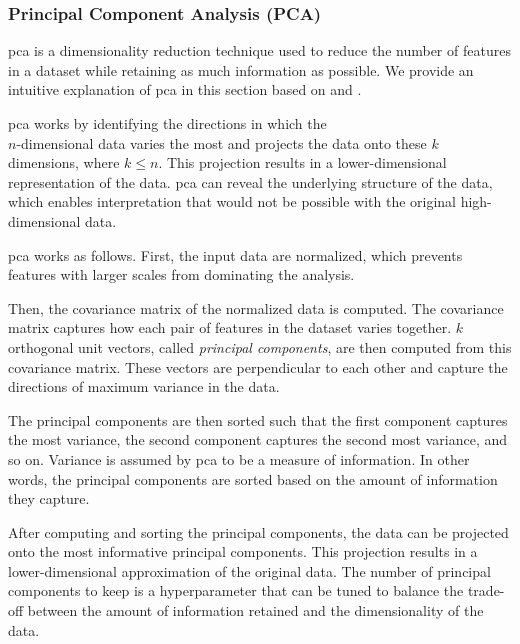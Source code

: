 \subsubsection{Principal Component Analysis (PCA)}\label{subsec:pca}
\gls{pca} is a dimensionality reduction technique used to reduce the number of features in a dataset while retaining as much information as possible.
We provide an intuitive explanation of \gls{pca} in this section based on \citet{dataminingConcepts} and \citet{Vasques2024}.

\gls{pca} works by identifying the directions in which the\\$n$-dimensional data varies the most and projects the data onto these $k$ dimensions, where $k \leq n$.
This projection results in a lower-dimensional representation of the data.
\gls{pca} can reveal the underlying structure of the data, which enables interpretation that would not be possible with the original high-dimensional data.

\gls{pca} works as follows.
First, the input data are normalized, which prevents features with larger scales from dominating the analysis.

Then, the covariance matrix of the normalized data is computed.
The covariance matrix captures how each pair of features in the dataset varies together.
$k$ orthogonal unit vectors, called \textit{principal components}, are then computed from this covariance matrix.
These vectors are perpendicular to each other and capture the directions of maximum variance in the data.

The principal components are then sorted such that the first component captures the most variance, the second component captures the second most variance, and so on.
Variance is assumed by \gls{pca} to be a measure of information.
In other words, the principal components are sorted based on the amount of information they capture.

After computing and sorting the principal components, the data can be projected onto the most informative principal components.
This projection results in a lower-dimensional approximation of the original data.
The number of principal components to keep is a hyperparameter that can be tuned to balance the trade-off between the amount of information retained and the dimensionality of the data.
